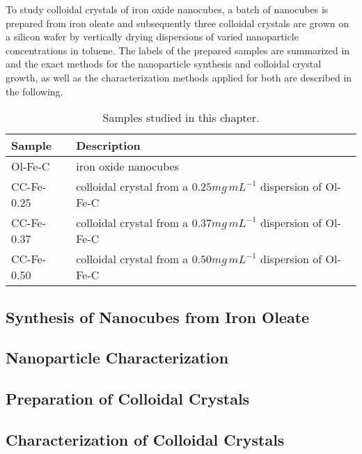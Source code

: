 \documentclass[\main/dresen_thesis.tex]{subfiles}
\renewcommand{\thisPath}{\main/chapters/colloidalCrystals/experimentalMethods/}
\begin{document}
  To study colloidal crystals of iron oxide nanocubes, a batch of nanocubes is prepared from iron oleate and subsequently three colloidal crystals are grown on a silicon wafer by vertically drying dispersions of varied nanoparticle concentrations in toluene.
  The labels of the prepared samples are summarized in  and the exact methods for the nanoparticle synthesis and colloidal crystal growth, as well as the characterization methods applied for both are described in the following.
  \begin{table}[!htbp]
    \centering
    \caption{\label{tab:colloidalCrystals:expMethods:samples}Samples studied in this chapter.}
    \begin{tabular}{ l | l }
      \textbf{Sample}  & Description \\
      \hline
      Ol-Fe-C       & iron oxide nanocubes\\
      CC-Fe-0.25    & colloidal crystal from a $0.25 \unit{mg \, mL^{-1}}$ dispersion of Ol-Fe-C\\
      CC-Fe-0.37    & colloidal crystal from a $0.37 \unit{mg \, mL^{-1}}$ dispersion of Ol-Fe-C\\
      CC-Fe-0.50    & colloidal crystal from a $0.50 \unit{mg \, mL^{-1}}$ dispersion of Ol-Fe-C\\
      \hline
    \end{tabular}
  \end{table}

  \subsection{Synthesis of  Nanocubes from Iron Oleate}
    
      \FloatBarrier

  \subsection{Nanoparticle Characterization}
    
    \FloatBarrier
    \clearpage

  \subsection{Preparation of Colloidal Crystals}
    
    \FloatBarrier

  \subsection{Characterization of Colloidal Crystals}
    
    \FloatBarrier
\end{document}
